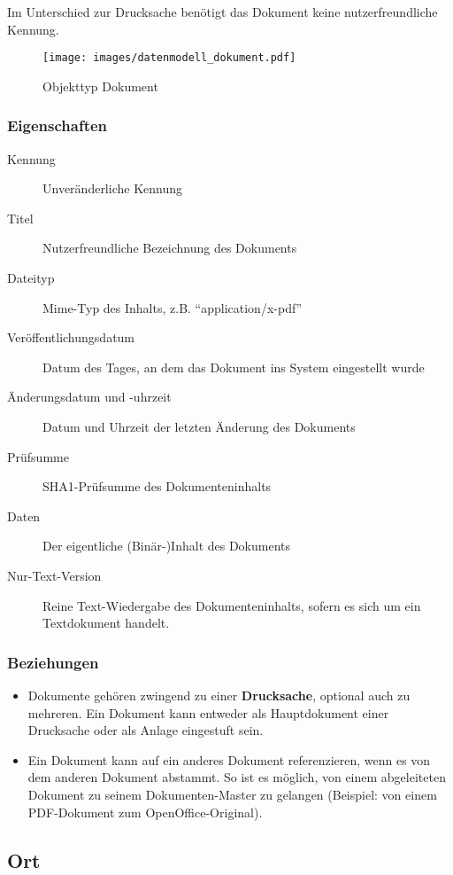 \documentclass[,a4paper]{article}
\makeatletter
\def\maxwidth{\ifdim\Gin@nat@width>\linewidth\linewidth
\else\Gin@nat@width\fi}
\let\Oldincludegraphics\includegraphics
\renewcommand{\includegraphics}[1]{\Oldincludegraphics[width=\maxwidth]{#1}}
\makeatother
\begin{document}
Im Unterschied zur Drucksache benötigt das Dokument keine
nutzerfreundliche Kennung.

\begin{figure}[htbp]
\centering
\texttt{[image: images/datenmodell\_dokument.pdf]}
\caption{Objekttyp Dokument}
\end{figure}

\subsubsection{Eigenschaften}

\begin{description}
\item[Kennung]
Unveränderliche Kennung
\item[Titel]
Nutzerfreundliche Bezeichnung des Dokuments
\item[Dateityp]
Mime-Typ des Inhalts, z.B. ``application/x-pdf''
\item[Veröffentlichungsdatum]
Datum des Tages, an dem das Dokument ins System eingestellt wurde
\item[Änderungsdatum und -uhrzeit]
Datum und Uhrzeit der letzten Änderung des Dokuments
\item[Prüfsumme]
SHA1-Prüfsumme des Dokumenteninhalts
\item[Daten]
Der eigentliche (Binär-)Inhalt des Dokuments
\item[Nur-Text-Version]
Reine Text-Wiedergabe des Dokumenteninhalts, sofern es sich um ein
Textdokument handelt.
\end{description}

\subsubsection{Beziehungen}

\begin{itemize}
\item
  Dokumente gehören zwingend zu einer \textbf{Drucksache}, optional auch
  zu mehreren. Ein Dokument kann entweder als Hauptdokument einer
  Drucksache oder als Anlage eingestuft sein.
\item
  Ein Dokument kann auf ein anderes Dokument referenzieren, wenn es von
  dem anderen Dokument abstammt. So ist es möglich, von einem
  abgeleiteten Dokument zu seinem Dokumenten-Master zu gelangen
  (Beispiel: von einem PDF-Dokument zum OpenOffice-Original).
\end{itemize}

\subsection{Ort}
\end{document}
